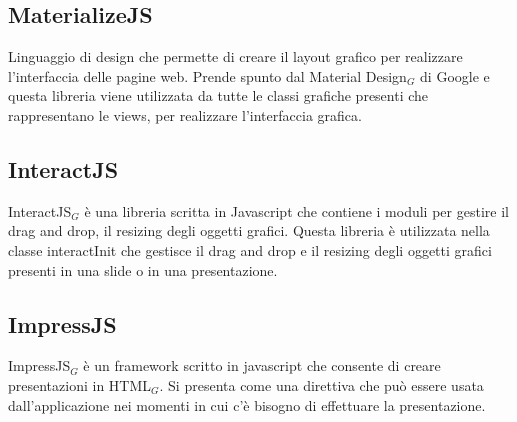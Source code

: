 \subsection{MaterializeJS}

Linguaggio di design che permette di creare il layout grafico per realizzare l'interfaccia delle pagine web. Prende spunto dal Material Design$_G$ di Google e questa libreria viene utilizzata da tutte le classi grafiche presenti che rappresentano le views, per realizzare l'interfaccia grafica. 

\subsection{InteractJS}

InteractJS$_G$ è una libreria scritta in Javascript che contiene i moduli per gestire il drag and drop, il resizing degli oggetti grafici.
Questa libreria è utilizzata nella classe interactInit che gestisce il drag and drop e il resizing degli oggetti grafici presenti in una slide o in una presentazione.

\subsection{ImpressJS}

ImpressJS$_G$ è un framework scritto in javascript che consente di creare presentazioni in HTML$_G$. Si presenta come una direttiva che può essere usata dall'applicazione nei momenti in cui c'è bisogno di effettuare la presentazione. 



